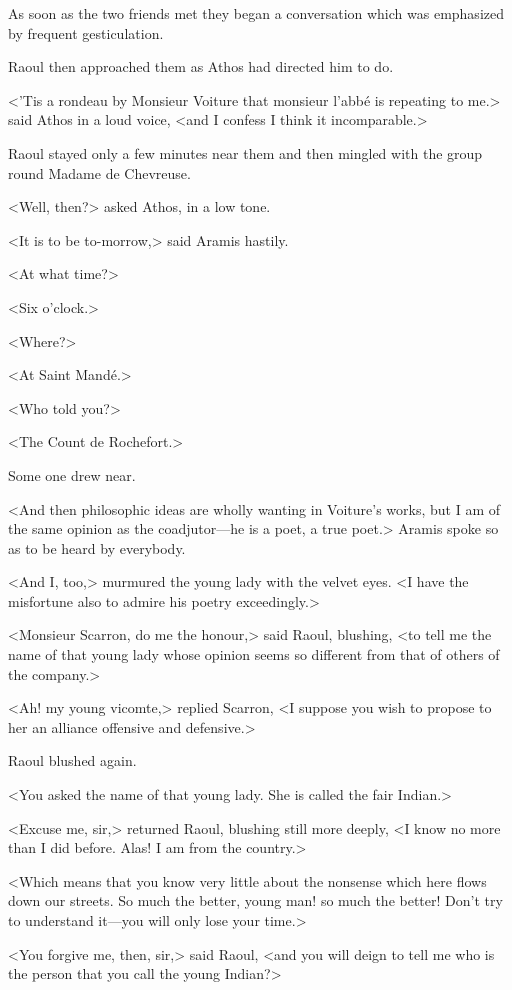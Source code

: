 As soon as the two friends met they began a conversation which was emphasized by frequent gesticulation.

Raoul then approached them as Athos had directed him to do.

<'Tis a rondeau by Monsieur Voiture that monsieur l'abbé is repeating to me.> said Athos in a loud voice, <and I confess I think it incomparable.>

Raoul stayed only a few minutes near them and then mingled with the group round Madame de Chevreuse.

<Well, then?> asked Athos, in a low tone.

<It is to be to-morrow,> said Aramis hastily.

<At what time?>

<Six o'clock.>

<Where?>

<At Saint Mandé.>

<Who told you?>

<The Count de Rochefort.>

Some one drew near.

<And then philosophic ideas are wholly wanting in Voiture's works, but I am of the same opinion as the coadjutor—he is a poet, a true poet.> Aramis spoke so as to be heard by everybody.

<And I, too,> murmured the young lady with the velvet eyes. <I have the misfortune also to admire his poetry exceedingly.>

<Monsieur Scarron, do me the honour,> said Raoul, blushing, <to tell me the name of that young lady whose opinion seems so different from that of others of the company.>

<Ah! my young vicomte,> replied Scarron, <I suppose you wish to propose to her an alliance offensive and defensive.>

Raoul blushed again.

<You asked the name of that young lady. She is called the fair Indian.>

<Excuse me, sir,> returned Raoul, blushing still more deeply, <I know no more than I did before. Alas! I am from the country.>

<Which means that you know very little about the nonsense which here flows down our streets. So much the better, young man! so much the better! Don't try to understand it—you will only lose your time.>

<You forgive me, then, sir,> said Raoul, <and you will deign to tell me who is the person that you call the young Indian?>

